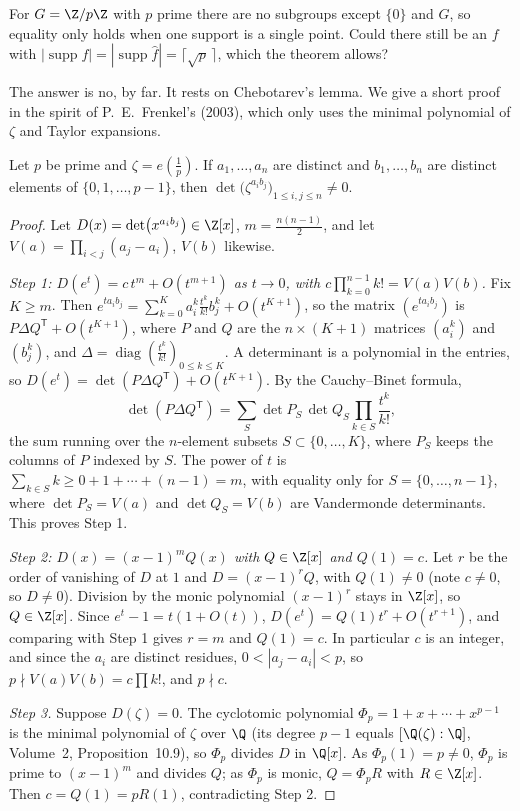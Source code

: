 \begin{think}
For $G=\Z/p\Z$ with $p$ prime there are no subgroups except $\{0\}$ and $G$, so equality only holds when one support is a single
point. Could there still be an $f$ with $|\operatorname{supp}f|=|\operatorname{supp}\hat f|=\lceil\sqrt p\,\rceil$, which the theorem allows?
\end{think}

The answer is no, by far. It rests on Chebotarev's lemma. We give a short proof in the spirit of P.~E.~Frenkel's (2003), which only uses
the minimal polynomial of $\zeta$ and Taylor expansions.

\begin{lemma}[Chebotarev, 1926]\label{lem:chebotarev}
Let $p$ be prime and $\zeta=e(\frac1p)$. If $a_1,\dots,a_n$ are distinct and $b_1,\dots,b_n$ are distinct elements of $\{0,1,\dots,p-1\}$,
then $\det\bigl(\zeta^{a_ib_j}\bigr)_{1\le i,j\le n}\ne0$.
\end{lemma}
\begin{proof}
Let $D(x)=\det\bigl(x^{a_ib_j}\bigr)\in\Z[x]$, $m=\frac{n(n-1)}2$, and let $V(a)=\prod_{i<j}(a_j-a_i)$, $V(b)$ likewise.

\emph{Step 1: $D(e^t)=c\,t^m+O(t^{m+1})$ as $t\to0$, with $c\prod_{k=0}^{n-1}k!=V(a)V(b)$.} Fix $K\ge m$. Then
$e^{ta_ib_j}=\sum_{k=0}^Ka_i^k\frac{t^k}{k!}b_j^k+O(t^{K+1})$, so the matrix $(e^{ta_ib_j})$ is $P\Delta Q^{\mathsf T}+O(t^{K+1})$, where $P$ and $Q$ are the
$n\times(K+1)$ matrices $(a_i^k)$ and $(b_j^k)$, and $\Delta=\operatorname{diag}(\frac{t^k}{k!})_{0\le k\le K}$. A determinant is a polynomial in the
entries, so $D(e^t)=\det(P\Delta Q^{\mathsf T})+O(t^{K+1})$. By the Cauchy--Binet formula,
\[\det(P\Delta Q^{\mathsf T})=\sum_{S}\det P_S\,\det Q_S\prod_{k\in S}\frac{t^k}{k!},\]
the sum running over the $n$-element subsets $S\subset\{0,\dots,K\}$, where $P_S$ keeps the columns of $P$ indexed by $S$. The power of $t$ is
$\sum_{k\in S}k\ge0+1+\cdots+(n-1)=m$, with equality only for $S=\{0,\dots,n-1\}$, where $\det P_S=V(a)$ and $\det Q_S=V(b)$ are Vandermonde
determinants. This proves Step 1.

\emph{Step 2: $D(x)=(x-1)^mQ(x)$ with $Q\in\Z[x]$ and $Q(1)=c$.} Let $r$ be the order of vanishing of $D$ at $1$ and $D=(x-1)^rQ$, with
$Q(1)\ne0$ (note $c\ne0$, so $D\ne0$). Division by the monic polynomial $(x-1)^r$ stays in $\Z[x]$, so $Q\in\Z[x]$. Since
$e^t-1=t(1+O(t))$, $D(e^t)=Q(1)t^r+O(t^{r+1})$, and comparing with Step 1 gives $r=m$ and $Q(1)=c$. In particular $c$ is an integer, and since
the $a_i$ are distinct residues, $0<|a_j-a_i|<p$, so $p\nmid V(a)V(b)=c\prod k!$, and $p\nmid c$.

\emph{Step 3.} Suppose $D(\zeta)=0$. The cyclotomic polynomial $\Phi_p=1+x+\cdots+x^{p-1}$ is the minimal polynomial of $\zeta$ over $\Q$
(its degree $p-1$ equals $[\Q(\zeta):\Q]$, Volume~2, Proposition~10.9), so $\Phi_p$ divides $D$ in $\Q[x]$. As $\Phi_p(1)=p\ne0$, $\Phi_p$ is prime to
$(x-1)^m$ and divides $Q$; as $\Phi_p$ is monic, $Q=\Phi_pR$ with $R\in\Z[x]$. Then $c=Q(1)=pR(1)$, contradicting Step 2.
\end{proof}

